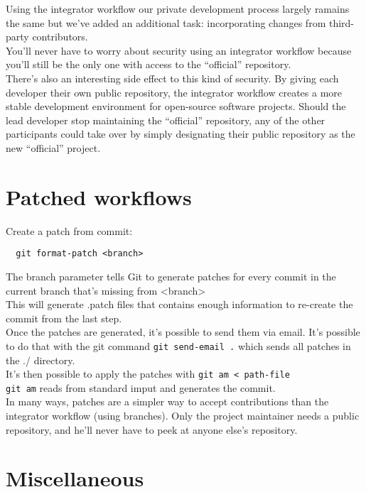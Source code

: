 \documentclass[french]{article}
\begin{document}
Using the integrator workflow our private development process largely ramains the same but we've added an additional task: incorporating changes from third-party contributors.\\
You'll never have to worry about security using an integrator workflow because you'll still be the only one with access to the ``official'' repository.\\
There's also an interesting side effect to this kind of security. By giving each developer their own public repository, the integrator workflow creates a more stable development environment for open-source software projects. Should the lead developer stop maintaining the ``official'' repository, any of the other participants could take over by simply designating their public repository as the new ``official'' project.

\section{Patched workflows}

Create a patch from commit:
\begin{verbatim}
  git format-patch <branch>
\end{verbatim}
The branch parameter tells Git to generate patches for every commit in the current branch that's missing from <branch>\\
This will generate .patch files that contains enough information to re-create the commit from the last step.\\

Once the patches are generated, it's possible to send them via email. It's possible to do that with the git command \verb|git send-email .| which sends all patches in the ./ directory.\\

It's then possible to apply the patches with \verb|git am < path-file|\\
\verb|git am| reads from standard imput and generates the commit.\\

In many ways, patches are a simpler way to accept contributions than the integrator workflow (using branches). Only the project maintainer needs a public repository, and he'll never have to peek at anyone else's repository.

\section{Miscellaneous}
\end{document}

